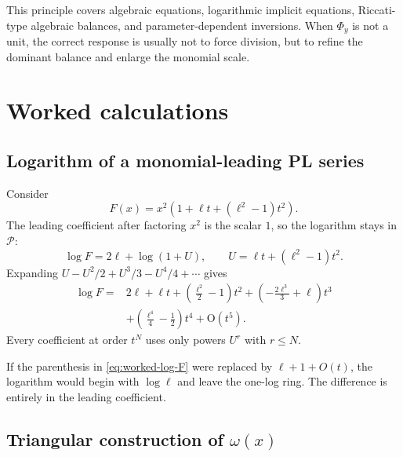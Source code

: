 \documentclass[11pt,oneside]{article}
\numberwithin{equation}{section}
\theoremstyle{definition}
\newcommand{\PL}{\mathscr P}
\newcommand{\bigO}{\mathrm{O}}
\begin{document}
This principle covers algebraic equations, logarithmic implicit equations,
Riccati-type algebraic balances, and parameter-dependent inversions.  When
\(\Phi_y\) is not a unit, the correct response is usually not to force division,
but to refine the dominant balance and enlarge the monomial scale.

\section{Worked calculations}\label{sec:worked}

\subsection{Logarithm of a monomial-leading PL series}

Consider
\begin{equation}\label{eq:worked-log-F}
  F(x)=x^2\left(1+\ell t+(\ell^2-1)t^2\right).
\end{equation}
The leading coefficient after factoring \(x^2\) is the scalar \(1\), so the
logarithm stays in \(\PL\):
\[
  \log F=2\ell+\log(1+U),
  \qquad U=\ell t+(\ell^2-1)t^2.
\]
Expanding \(U-U^2/2+U^3/3-U^4/4+\cdots\) gives
\begin{align}
 \log F={}&2\ell+\ell t
 +\left(\frac{\ell^2}{2}-1\right)t^2
 +\left(-\frac{2\ell^3}{3}+\ell\right)t^3\nonumber\\
 &+\left(\frac{\ell^4}{4}-\frac12\right)t^4
 +\bigO(t^5).
 \label{eq:worked-log-result}
\end{align}
Every coefficient at order \(t^N\) uses only powers \(U^r\) with \(r\le N\).

If the parenthesis in \eqref{eq:worked-log-F} were replaced by
\(\ell+1+O(t)\), the logarithm would begin with \(\log\ell\) and leave the
one-log ring.  The difference is entirely in the leading coefficient.

\subsection{Triangular construction of \(\omega(x)\)}
\end{document}
